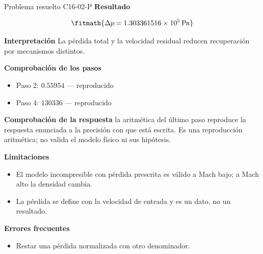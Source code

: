 \documentclass[10pt,openany]{book}
\begin{document}
\begin{studiumworked}{Problema resuelto C16-02-P}
\noindent\textbf{Resultado}

\[
\fitmath{\Delta p=1.303361516\times10^{5}\,\mathrm{Pa}}
\]

\noindent\textbf{Interpretación}
La pérdida total y la velocidad residual reducen recuperación por mecanismos distintos.

\noindent\textbf{Comprobación de los pasos}
\begin{itemize}
\item Paso 2: $0.55954$ — reproducido
\item Paso 4: $130336$ — reproducido
\end{itemize}

\noindent\textbf{Comprobación de la respuesta} la aritmética del último paso reproduce la respuesta enunciada a la precisión con que está escrita. Es una reproducción aritmética; no valida el modelo físico ni sus hipótesis.

\noindent\textbf{Limitaciones}
\begin{itemize}
\item El modelo incompresible con pérdida prescrita es válido a Mach bajo; a Mach alto la densidad cambia.
\item La pérdida se define con la velocidad de entrada y es un dato, no un resultado.
\end{itemize}

\noindent\textbf{Errores frecuentes}
\begin{itemize}
\item Restar una pérdida normalizada con otro denominador.
\end{itemize}
\end{studiumworked}
\end{document}

